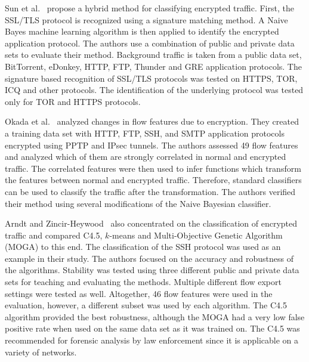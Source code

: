Sun et al.~\cite{Sun-2010-Novel} propose a hybrid method for classifying encrypted traffic. First, the SSL/TLS protocol is recognized using a signature matching method. A Naive Bayes machine learning algorithm is then applied to identify the encrypted application protocol. The authors use a combination of public and private data sets to evaluate their method. Background traffic is taken from a public data set, BitTorrent, eDonkey, HTTP, FTP, Thunder and GRE application protocols. The signature based recognition of SSL/TLS protocols was tested on HTTPS, TOR, ICQ and other protocols. The identification of the underlying protocol was tested only for TOR and HTTPS protocols.

Okada et al.~\cite{Okada-2011-Application} analyzed changes in flow features due to encryption. They created a training data set with HTTP, FTP, SSH, and SMTP application protocols encrypted using PPTP and IPsec tunnels. The authors assessed 49 flow features and analyzed which of them are strongly correlated in normal and encrypted traffic. The correlated features were then used to infer functions which transform the features between normal and encrypted traffic. Therefore, standard classifiers can be used to classify the traffic after the transformation. The authors verified their method using several modifications of the Naive Bayesian classifier.

Arndt and Zincir-Heywood~\cite{Arndt-2011-Comparison} also concentrated on the classification of encrypted traffic and compared C4.5, $k$-means and Multi-Objective Genetic Algorithm (MOGA) to this end. The classification of the SSH protocol was used as an example in their study. The authors focused on the accuracy and robustness of the algorithms. Stability was tested using three different public and private data sets for teaching and evaluating the methods. Multiple different flow export settings were tested as well. Altogether, 46 flow features were used in the evaluation, however, a different subset was used by each algorithm. The C4.5 algorithm provided the best robustness, although the MOGA had a very low false positive rate when used on the same data set as it was trained on. The C4.5 was recommended for forensic analysis by law enforcement since it is applicable on a variety of networks.

